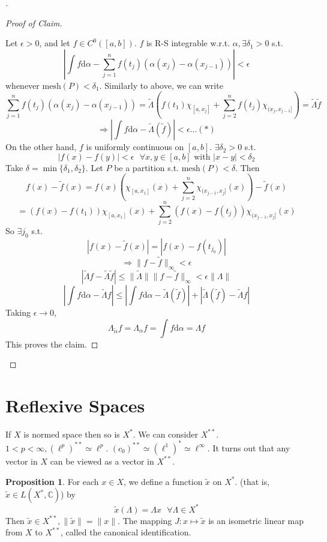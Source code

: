 \documentclass{article}
\theoremstyle{definition}
\newtheorem{prop}{Proposition}
\newenvironment{proofs}[1][\proofname]{%
  \begin{proof}[#1]$ $\par\nobreak\ignorespaces
}{%
  \end{proof}
}
\newcommand{\sfa}{\text{  } \forall}
\begin{document}
\begin{proofs}
	\begin{proofs}[Proof of Claim]
		Let $\epsilon > 0$, and let $f \in C^0([a, b])$.
		$f$ is R-S integrable w.r.t. $\alpha, \exists \delta_1 > 0$ s.t.
		\[
			\left|\int f \mathrm{d} \alpha - \sum_{j = 1}^n f(t_j)(\alpha(x_j) - \alpha(x_{j - 1}))\right| < \epsilon
		\]
		whenever $\text{mesh}(P) < \delta_1$.
		Similarly to above, we can write
		\[
			\sum_{j = 1}^n f(t_j)(\alpha(x_j) - \alpha(x_{j - 1})) = \tilde{\Lambda}\left(f(t_1) \chi_{[a, x_j]} + \sum_{j = 2}^n f(t_j) \chi_{(x_j, x_{j - 1}]}\right) = \tilde{\Lambda} \tilde{f}
		\]
		\[
			\Rightarrow \left|\int f \mathrm{d} \alpha - \tilde{\Lambda}(\tilde{f})\right| < \epsilon ... (*)
		\]
		On the other hand, $f$ is uniformly continuous on $[a ,b]$.
		$\exists \delta_2 > 0$ s.t.
		\[
			|f(x) - f(y) | < \epsilon \sfa x, y \in [a, b] \text{ with }|x - y| < \delta_2
		\]
		Take $\delta = \min\{\delta_1, \delta_2\}$.
		Let $P$ be a partition s.t. $\text{mesh}(P) < \delta$.
		Then
		\[
			f(x) - \tilde{f}(x) =  f(x) \left(\chi_{[a, x_1]}(x) + \sum_{j = 2}^n \chi_{(x_{j - 1}, x_j]}(x)\right) - \tilde{f}(x)
		\]
		\[
			= (f(x) - f(t_1)) \chi_{[a, x_1]}(x) + \sum_{j = 2}^n(f(x) - f(t_j)) \chi_{(x_{j - 1}, x_j]}(x)
		\]
		So $\exists j_0$ s.t.
		\[
			|f(x) - \tilde{f}(x)| = |f(x) - f(t_{j_0})|
		\]
		\[
			\Rightarrow \|f - \tilde{f}\|_{\infty} < \epsilon
		\]
		\[
			|\tilde{\Lambda} f - \tilde{\Lambda}\tilde{f}| \leq \|\tilde{\Lambda}\|\|f - \tilde{f}\|_{\infty} < \epsilon \|\Lambda\|
		\]
		\[
			\left|\int f \mathrm{d} \alpha - \tilde{\Lambda} f\right| \leq \left|\int f \mathrm{d} \alpha - \tilde{\Lambda}(\tilde{f})\right| + |\tilde{\Lambda}(\tilde{f}) - \tilde{\Lambda} f|
		\]
		Taking $\epsilon \to 0$, 
		\[
			\Lambda_{\tilde{\alpha}} f = \Lambda_\alpha f = \int f \mathrm{d} \alpha = \Lambda f
		\]
		This proves the claim.
	\end{proofs}
\end{proofs}

\section*{Reflexive Spaces}

If $X$ is normed space then so is $X^*$.
We can consider $X^{**}$.
$1 < p < \infty, (\ell^p)^{**} \simeq \ell^p$.
$(c_0)^{**} \simeq (\ell^1)^* \simeq \ell^\infty$.
It turns out that any vector in $X$ can be viewed as a vector in $X^{**}$.

\begin{prop}
	For each $x\in X$, we define a function $\tilde{x}$ on $X^*$.
	(that is, $\tilde{x} \in L(X^*, \mathbb{C})$) by 
	\[
		\tilde{x}(\Lambda) = \Lambda x \sfa \Lambda \in X^*
	\]
	Then $\tilde{x} \in X^{**}, \|\tilde{x}\| = \|x\|$.
	The mapping $J:x \mapsto \tilde{x}$ is an isometric linear map from $X$ to $X^{**}$, called the canonical identification.
\end{prop}
\end{document}
